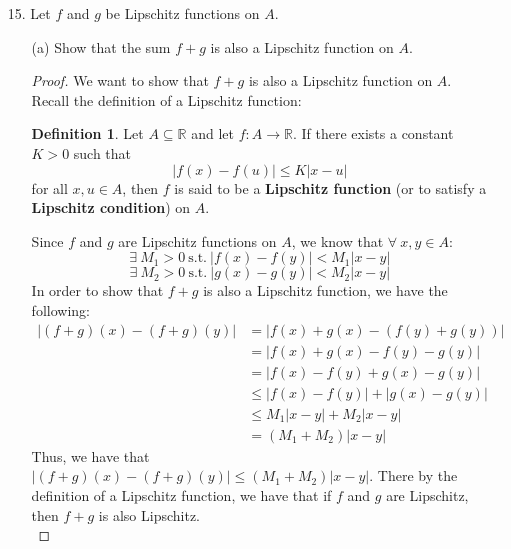\documentclass[12pt,letterpaper]{article}
\newcommand{\st}{\ \text{s.t.}\ }
\newcommand{\R}{\mathbb{R}}
\theoremstyle{case}
\theoremstyle{definition}
\newtheorem{definition*}{Definition}
\begin{document}
\begin{enumerate}
\begin{enumerate}
\begin{proof}
				Since $[0,p]$ is a closed bounded interval, we know that by \textit{Theorem 5.3.9}, $f([0,p])$ is also a closed bounded interval. Thus we have that $f$ is bounded.\\
				
				Now we must show that $f$ is uniformly continuous on $\R$. So, by the \textit{Uniform Continuity Theorem}, since $f$ is continuous on $[0,p]$ and since $[0,p]$ is a closed bounded interval, we have that $f$ is uniformly continuous on $[0,p]$. Since $f([0,p])=f([np,(n+1)p])$, we have that $f$ is uniformly continuous on $[np, (n+1)p]$ and thus we have that $f$ is uniformly continuous on $\R$.\\
			\end{proof}			
			\item[15.] Let $f$ and $g$ be Lipschitz functions on $A$.
			\begin{enumerate}
				\item[(a)] Show that the sum $f+g$ is also a Lipschitz function on $A$.
				
				\begin{proof}
					We want to show that $f+g$ is also a Lipschitz function on $A$.\\
					
					Recall the definition of a Lipschitz function:
					\theoremstyle{definition}
					\begin{definition*}
						Let $A \subseteq \R$ and let $f:A \rightarrow \R$. If there exists a constant $K > 0$ such that 
						\[|f(x)-f(u)| \leq K|x-u|\]
						for all $x,u \in A$, then $f$ is said to be a \textbf{Lipschitz function} (or to satisfy a \textbf{Lipschitz condition}) on $A$.
					\end{definition*}
					Since $f$ and $g$ are Lipschitz functions on $A$, we know that $\forall\ x,y \in A$:
					\[\exists\ M_1 > 0 \st |f(x)-f(y)|<M_1|x-y|\]
					\[\exists\ M_2 > 0 \st |g(x)-g(y)|<M_2|x-y|\]
					In order to show that $f+g$ is also a Lipschitz function, we have the following:
					\begin{align*}
						|(f+g)(x)-(f+g)(y)| &= |f(x)+g(x)-(f(y)+g(y))| \\
						&=|f(x)+g(x)-f(y)-g(y)| \\
						&=|f(x)-f(y)+g(x)-g(y)| \\
						&\leq |f(x)-f(y)| + |g(x)-g(y)| \\
						&\leq M_1|x-y| + M_2|x-y| \\
						&= (M_1+M_2)|x-y|
					\end{align*}
					Thus, we have that $|(f+g)(x)-(f+g)(y)| \leq (M_1+M_2)|x-y|$. There by the definition of a Lipschitz function, we have that if $f$ and $g$ are Lipschitz, then $f+g$ is also Lipschitz.\\
				\end{proof}
				

\end{enumerate}
\end{enumerate}
\end{enumerate}
\end{document}
